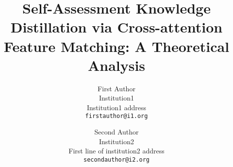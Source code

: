\documentclass[10pt,twocolumn,letterpaper]{article}
\begin{document}
\title{Self-Assessment Knowledge Distillation via Cross-attention Feature Matching: A Theoretical Analysis}

\author{First Author\\
Institution1\\
Institution1 address\\
{\tt\small firstauthor@i1.org}
\and
Second Author\\
Institution2\\
First line of institution2 address\\
{\tt\small secondauthor@i2.org}
}
\maketitle
\end{document}
